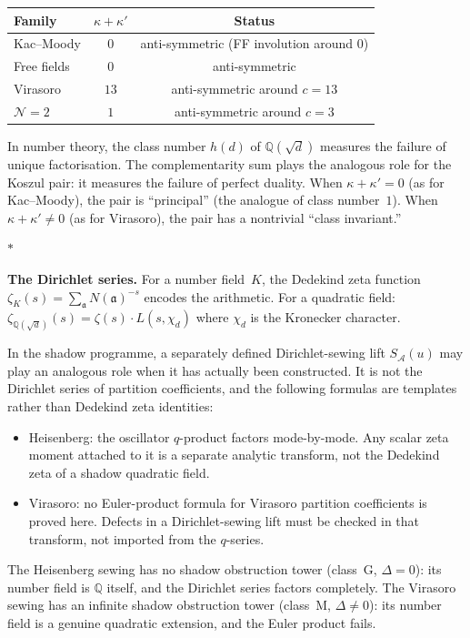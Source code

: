 \documentclass[11pt]{article}
\newcommand{\cA}{\mathcal{A}}
\newcommand{\cN}{\mathcal{N}}
\newcommand{\Q}{\mathbb{Q}}
\newcommand{\sep}{\bigskip\begin{center}$*$\end{center}\medskip}
\begin{document}
\begin{center}
\small
\renewcommand{\arraystretch}{1.15}
\begin{tabular}{@{}lcc@{}}
\textbf{Family}
  & $\kappa + \kappa'$
  & \textbf{Status} \\
\hline
Kac--Moody & $0$ & anti-symmetric (FF involution around $0$) \\
Free fields & $0$ & anti-symmetric \\
Virasoro & $13$ & anti-symmetric around $c = 13$ \\
$\cN = 2$ & $1$ & anti-symmetric around $c = 3$
\end{tabular}
\end{center}

\medskip

In number theory, the class number $h(d)$ of $\Q(\sqrt{d})$
measures the failure of unique factorisation.  The
complementarity sum plays the analogous role for the Koszul
pair: it measures the failure of perfect duality.  When
$\kappa + \kappa' = 0$ (as for Kac--Moody), the pair is
``principal'' (the analogue of class number~$1$).  When
$\kappa + \kappa' \neq 0$ (as for Virasoro), the pair has
a nontrivial ``class invariant.''

\sep

\noindent\textbf{The Dirichlet series.}\enspace
For a number field~$K$, the Dedekind zeta function
$\zeta_K(s) = \sum_{\mathfrak{a}} N(\mathfrak{a})^{-s}$
encodes the arithmetic.  For a quadratic field:
$\zeta_{\Q(\sqrt{d})}(s) = \zeta(s) \cdot L(s, \chi_d)$
where $\chi_d$ is the Kronecker character.

In the shadow programme, a separately defined Dirichlet-sewing
lift $S_\cA(u)$ may play an analogous role when it has actually
been constructed.  It is not the Dirichlet series of partition
coefficients, and the following formulas are templates rather
than Dedekind zeta identities:
\begin{itemize}[nosep]
\item Heisenberg:
  the oscillator $q$-product factors mode-by-mode.  Any scalar
  zeta moment attached to it is a separate analytic transform,
  not the Dedekind zeta of a shadow quadratic field.
\item Virasoro:
  no Euler-product formula for Virasoro partition coefficients
  is proved here.  Defects in a Dirichlet-sewing lift must be
  checked in that transform, not imported from the $q$-series.
\end{itemize}

The Heisenberg sewing has no shadow obstruction tower (class~G,
$\Delta = 0$): its number field is $\Q$ itself, and the
Dirichlet series factors completely.  The Virasoro sewing has
an infinite shadow obstruction tower (class~M, $\Delta \neq 0$): its
number field is a genuine quadratic extension, and the Euler
product fails.
\end{document}
